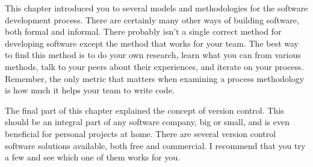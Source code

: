This chapter introduced you to several models and methodologies for the software development process. There are certainly many other ways of building software, both formal and informal. There probably isn’t a single correct method for developing software except the method that works for your team. The best way to find this method is to do your own research, learn what you can from various methods, talk to your peers about their experiences, and iterate on your process. Remember, the only metric that matters when examining a process methodology is how much it helps your team to write code.

The final part of this chapter explained the concept of version control. This should be an integral part of any software company, big or small, and is even beneficial for personal projects at home. There are several version control software solutions available, both free and commercial. I recommend that you try a few and see which one of them works for you.